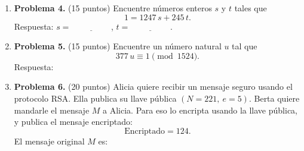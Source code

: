 \documentclass[11pt]{article}
\newcommand{\resp}{\underline{\hspace{3cm}}}
\begin{document}
\begin{enumerate}
\item[]\textbf{Problema 4.} (15 puntos) Encuentre números enteros $s$ y $t$ tales que
\[
1 = 1247\,s + 245\,t.
\]
Respuesta: $s = \underline{\hspace{2cm}}$, \quad $t = \underline{\hspace{2cm}}$.

\item[]\textbf{Problema 5.} (15 puntos) Encuentre un número natural $u$ tal que
\[
377\,u \equiv 1 \pmod{1524}.
\]
Respuesta: \resp

\item[]\textbf{Problema 6.} (20 puntos) Alicia quiere recibir un mensaje seguro usando el protocolo RSA. Ella publica su llave pública $(N = 221,\ e = 5)$. Berta quiere mandarle el mensaje $M$ a Alicia. Para eso lo encripta usando la llave pública, y publica el mensaje encriptado:
\[
\text{Encriptado} = 124.
\]
El mensaje original $M$ es: \resp

\end{enumerate}

\vfill
{}
\end{document}
